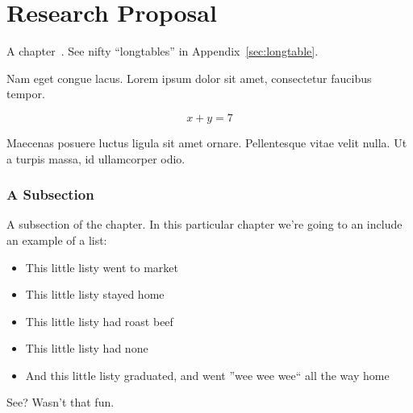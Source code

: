 \documentclass[letterpaper,12pt]{article}
\begin{document}





\bodymatter



\chapter{Research Proposal}
A chapter~\cite{ref:A,ref:B,ref:C}. See nifty ``longtables'' in Appendix~\ref{sec:longtable}.

Nam eget congue lacus. Lorem ipsum dolor sit amet, consectetur faucibus tempor.

\begin{equation}
x+y=7
\end{equation}

Maecenas posuere luctus ligula sit amet ornare. Pellentesque vitae velit nulla. Ut a turpis massa, id ullamcorper odio.

\subsection{A Subsection}%
A subsection of the chapter.  In this particular chapter we're going to an include an example of a list:
\begin{itemize}
	\item This little listy went to market
	\item This little listy stayed home
	\item This little listy had roast beef
	\item This little listy had none
	\item And this little listy graduated, and went ''wee wee wee`` all the way home
\end{itemize}
See? Wasn't that fun.
\end{document}
